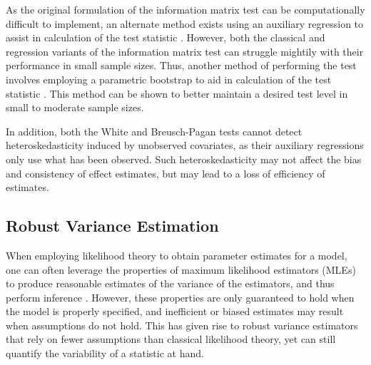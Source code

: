 \documentclass[sn-mathphys-ay]{sn-jnl}
\begin{document}
        As the original formulation of the information matrix test can be computationally difficult to implement, an alternate method exists using an
		auxiliary regression to assist in calculation of the test statistic \citep{Chesher}. However, both the classical and regression variants of the information matrix test can struggle mightily with their performance in small sample sizes. Thus, another method of performing the test involves employing a parametric bootstrap to aid in calculation of the test statistic \citep{Dhaene}. This method can be shown to better maintain a desired test level in small to moderate sample sizes. 

		In addition, both the White and Breusch-Pagan tests cannot detect heteroskedasticity induced by unobserved covariates, as their auxiliary regressions only use what has been observed. Such heteroskedasticity
		may not affect the bias and consistency of effect estimates, but may lead to a loss of efficiency of estimates. 

	\subsection{Robust Variance Estimation}

		When employing likelihood theory to obtain parameter estimates for a model, one can often leverage the properties of maximum likelihood estimators (MLEs) to produce reasonable estimates of the variance of the
		estimators, and thus perform inference \citep{Millar}. However, these properties are only guaranteed to hold when the model is properly specified, and inefficient or biased estimates may result when assumptions
		do not hold. This has given rise to robust variance estimators that rely on fewer assumptions than classical likelihood theory, yet can still quantify the variability of a statistic
		at hand.
\end{document}

